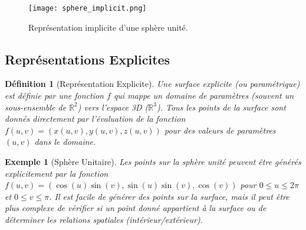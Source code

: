 \documentclass{article}
\newtheorem{definition}{Définition}
\newtheorem{example}{Exemple}
\begin{document}
\begin{figure}[H]
\centering
\texttt{[image: sphere\_implicit.png]} %
\caption{Représentation implicite d'une sphère unité.}
\label{fig:sphere_implicit}
\end{figure}

\subsection{Représentations Explicites}
\begin{definition}[Représentation Explicite]
Une surface explicite (ou paramétrique) est définie par une fonction $f$ qui mappe un domaine de paramètres (souvent un sous-ensemble de $\mathbb{R}^2$) vers l'espace 3D ($\mathbb{R}^3$). Tous les points de la surface sont donnés directement par l'évaluation de la fonction $f(u, v) = (x(u, v), y(u, v), z(u, v))$ pour des valeurs de paramètres $(u, v)$ dans le domaine.
\end{definition}

\begin{example}[Sphère Unitaire]
Les points sur la sphère unité peuvent être générés explicitement par la fonction $f(u, v) = (\cos(u)\sin(v), \sin(u)\sin(v), \cos(v))$ pour $0 \le u \le 2\pi$ et $0 \le v \le \pi$. Il est facile de générer des points sur la surface, mais il peut être plus complexe de vérifier si un point donné appartient à la surface ou de déterminer les relations spatiales (intérieur/extérieur).
\end{example}
\end{document}
